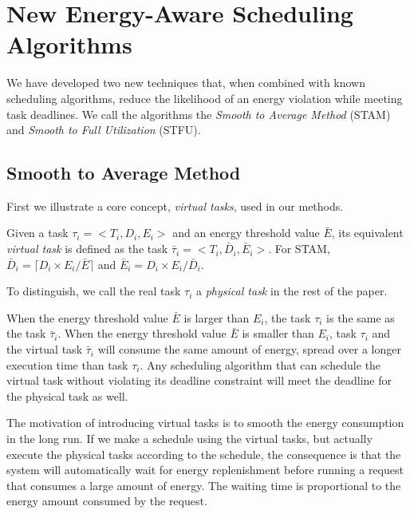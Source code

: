 
\section{New Energy-Aware Scheduling Algorithms} \label{sec:algorithms}
We have developed two new techniques that, when combined with known scheduling algorithms, reduce the likelihood of an energy violation while meeting task deadlines.  We call the algorithms the \emph{Smooth to Average Method} (\textsc{STAM}) and \emph{Smooth to Full Utilization} (\textsc{STFU}).

\subsection{Smooth to Average Method}
First we illustrate a core concept, \emph{virtual tasks}, used in our methods.

\begin{definition}
Given a task $\tau_i = <T_i, D_i, E_i>$ and an energy threshold value $\bar{E}$, its equivalent \emph{virtual task} is defined as the task $\bar{\tau}_i = <T_i, \bar{D}_i, \bar{E}_i>$.  For \textsc{STAM}, $\bar{D}_i = \lceil D_i \times  E_i / \bar{E} \rceil$ and $\bar{E}_i = D_i \times  E_i / \bar{D}_i$.
\end{definition}

To distinguish, we call the real task $\tau_i$ a \emph{physical task} in the rest of the paper.

\begin{remark}
When the energy threshold value $\bar{E}$ is larger than $E_i$, the task $\tau_i$ is the same as the task $\bar{\tau}_i$. When the energy threshold value $\bar{E}$ is smaller than $E_i$, task $\tau_i$ and the virtual task $\bar{\tau}_i$ will consume the same amount of energy, spread over a longer execution time than task $\tau_i$.  Any scheduling algorithm that can schedule the virtual task without violating its deadline constraint will meet the deadline for the physical task as well. %
\end{remark}
\begin{remark}
The motivation of introducing virtual tasks is to smooth the energy consumption in the long run. If we make a schedule using the virtual tasks, but actually execute the physical tasks according to the schedule, the consequence is that the system will automatically wait for energy replenishment before running a request that consumes a large amount of energy. The waiting time is proportional to the energy amount consumed by the request.
\end{remark}

